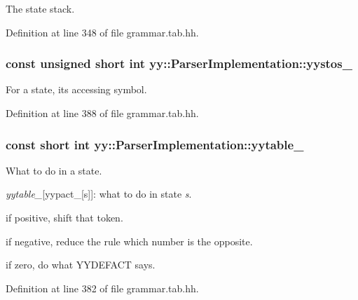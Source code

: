 The state stack. 



Definition at line 348 of file grammar.tab.hh.

\hypertarget{classyy_1_1_parser_implementation_a62806652360a422a003b04112c5d37bc}{
\subsubsection[{yystos\_\-}]{\setlength{\rightskip}{0pt plus 5cm}const unsigned short int {\bf yy::ParserImplementation::yystos\_\-}}}
\label{classyy_1_1_parser_implementation_a62806652360a422a003b04112c5d37bc}


For a state, its accessing symbol. 



Definition at line 388 of file grammar.tab.hh.

\hypertarget{classyy_1_1_parser_implementation_a7ff0dae4463142551743f4c28aa6c528}{
\subsubsection[{yytable\_\-}]{\setlength{\rightskip}{0pt plus 5cm}const short int {\bf yy::ParserImplementation::yytable\_\-}}}
\label{classyy_1_1_parser_implementation_a7ff0dae4463142551743f4c28aa6c528}


What to do in a state. 

{\itshape yytable\_\-\/}\mbox{[}yypact\_\-\mbox{[}s\mbox{]}\mbox{]}: what to do in state {\itshape s\/}.
\begin{DoxyItemize}
\item if positive, shift that token.
\item if negative, reduce the rule which number is the opposite.
\item if zero, do what YYDEFACT says. 
\end{DoxyItemize}

Definition at line 382 of file grammar.tab.hh.

